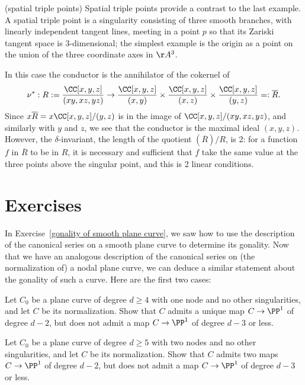 \begin{example} (spatial triple points) Spatial triple points provide a contrast to the last example. A spatial triple point is a singularity consisting of three smooth branches, with linearly independent tangent lines, meeting in a point $p$ so that its Zariski tangent space is 3-dimensional; the simplest example is the origin as a point on the union of the three coordinate axes in $\AA^3$.

In this case the conductor is the annihilator of the cokernel of
$$
\nu^{*}: R := \frac{\CC[x,y,z]}{(xy, xz, yz)} \to \frac{\CC[x,y,z]}{(x,y)} \times \frac{\CC[x,y,z]}{(x,z)} \times \frac{\CC[x,y,z]}{(y,z)} =: \overline R.
$$
Since $x\overline {R} = x \CC[x,y,z]/(y,z)$ is in the image of $\CC[x,y,z]/(xy, xz, yz)$, and similarly with $y$ and $z$,
we see that the conductor is the maximal ideal $(x,y,z)$. However, the $\delta$-invariant, the length
of the quotient $(\overline R)/R$, is 2: for a function $f$ in $\overline R$ to be in $R$, it
is necessary and sufficient that $f$ take the same value at the three points above the singular point, 
and this is
2 linear conditions.
\end{example}

\section{Exercises}

In Exercise~\ref{gonality of smooth plane curve}, we saw how to use the description of the canonical series on a smooth plane curve to determine its gonality. Now that we have an analogous description of the canonical series on (the normalization of) a nodal plane curve, we can deduce a similar statement about the gonality of such a curve. Here are the first two cases: 

\begin{exercise}
Let $C_0$ be a plane curve of degree $d\geq 4$ with one node and no other singularities, and let $C$ be its normalization. Show that $C$ admits a unique map $C \to \PP^1$ of degree $d-2$, but does not admit a map $C \to \PP^1$ of degree $d-3$ or less.
\end{exercise}

\begin{exercise}
Let $C_0$ be a plane curve of degree $d\geq 5$ with two nodes and no other singularities, and let $C$ be its normalization. Show that $C$ admits two maps $C \to \PP^1$ of degree $d-2$, but does not admit a map $C \to \PP^1$ of degree $d-3$ or less.
\end{exercise}

